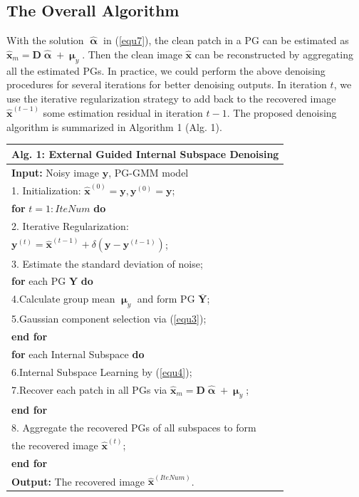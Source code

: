 \documentclass[10pt,twocolumn,letterpaper]{article}
\begin{document}
\subsection{The Overall Algorithm}
With the solution $\hat{\boldsymbol{\upalpha}}$ in (\ref{equ7}), the clean patch in a PG can be estimated as $\hat{\mathbf{x}}_{m}=\mathbf{D}\hat{\boldsymbol{\upalpha}}+\boldsymbol{\upmu}_{y}$. Then the clean image $\hat{\mathbf{x}}$ can be reconstructed by aggregating all the estimated PGs. In practice, we could perform the above denoising procedures for several iterations for better denoising outputs. In iteration $t$, we use the iterative regularization strategy \cite{osher2005iterative} to add back to the recovered image $\hat{\mathbf{x}}^{(t-1)}$ some estimation residual in iteration $t-1$. The proposed denoising algorithm is summarized in Algorithm 1 (Alg. 1).

\begin{table}
\label{alg1}
\begin{tabular}{l}
\hline
\textbf{Alg. 1}: External Guided Internal Subspace Denoising
\\
\hline
\textbf{Input:} Noisy image $\mathbf{y}$, PG-GMM model
\\
1. Initialization: $\hat{\mathbf{x}}^{(0)}=\mathbf{y},\mathbf{y}^{(0)}=\mathbf{y}$;
\\
\textbf{for} $t = 1:IteNum$ \textbf{do}
\\
2. Iterative Regularization:
\\
\quad\quad\quad $\mathbf{y}^{(t)}=\hat{\mathbf{x}}^{(t-1)}+\delta(\mathbf{y}-\mathbf{y}^{(t-1)})$;
\\
3. Estimate the standard deviation of noise;
\\
\quad\textbf{for} each PG $\mathbf{Y}$ \textbf{do}
\\
4.\quad Calculate group mean $\boldsymbol{\upmu}_{y}$ and form PG $\mathbf{\overline{Y}}$;
\\
5.\quad Gaussian component selection via (\ref{equ3});
\\
\quad\textbf{end for}
\\
\quad\textbf{for} each Internal Subspace \textbf{do}
\\
6.\quad Internal Subspace Learning by (\ref{equ4});
\\
7.\quad Recover each patch in all PGs via $\hat{\mathbf{x}}_{m}=\mathbf{D}\hat{\boldsymbol{\upalpha}}+\boldsymbol{\upmu}_{y}$;
\\
\quad\textbf{end for}
\\
8. Aggregate the recovered PGs of all subspaces to form
\\
\quad the recovered image $\hat{\mathbf{x}}^{(t)}$;
\\
\textbf{end for}
\\
\textbf{Output:} The recovered image $\hat{\mathbf{x}}^{(IteNum)}$.\\
\hline
\end{tabular}
\end{table}
\end{document}
